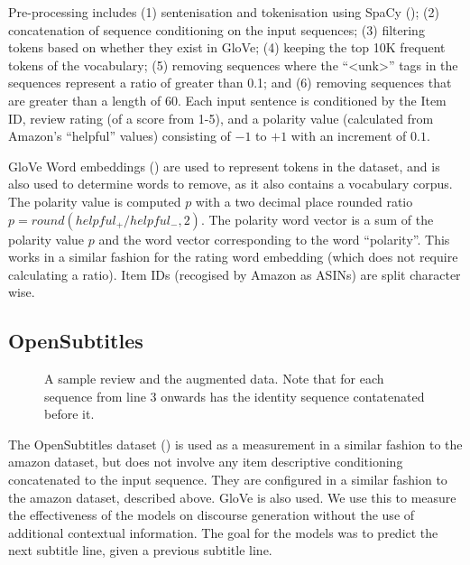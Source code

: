 \documentclass[12pt,twoside]{report}
\begin{document}

Pre-processing includes (1) sentenisation and tokenisation using SpaCy (\cite{honnibal_spacy_2017}); (2) concatenation of sequence conditioning on the input sequences; (3) filtering tokens based on whether they exist in GloVe; (4) keeping the top 10K frequent tokens of the vocabulary; (5) removing sequences where the ``\textless{}unk\textgreater'' tags in the sequences represent a ratio of greater than 0.1; and (6) removing sequences that are greater than a length of 60. Each input sentence is conditioned by the Item ID, review rating (of a score from 1-5), and a polarity value (calculated from Amazon's ``helpful'' values) consisting of $-1$ to $+1$ with an increment of $0.1$.


GloVe Word embeddings (\cite{pennington_glove:_2014}) are used to represent tokens in the dataset, and is also used to determine words to remove, as it also contains a vocabulary corpus. The polarity value is computed $p$ with a two decimal place rounded ratio $p=round(helpful_{+}/helpful_{-},2)$. The polarity word vector is a sum of the polarity value $p$ and the word vector corresponding to the word ``polarity''. This works in a similar fashion for the rating word embedding (which does not require calculating a ratio). Item IDs (recogised by Amazon as ASINs) are split character wise.

\subsection{OpenSubtitles}

\begin{figure}[!ht]
	\centering
	
	\caption{A sample review and the augmented data. Note that for each sequence from line 3 onwards has the identity sequence contatenated before it. \label{ex_dataset:subs}}
	\end{figure}

The OpenSubtitles dataset (\cite{lison_opensubtitles2016:_2016}) is used as a measurement in a similar fashion to the amazon dataset, but does not involve any item descriptive conditioning concatenated to the input sequence. They are configured in a similar fashion to the amazon dataset, described above. GloVe is also used. We use this to measure the effectiveness of the models on discourse generation without the use of additional contextual information. The goal for the models was to predict the next subtitle line, given a previous subtitle line.
\end{document}
